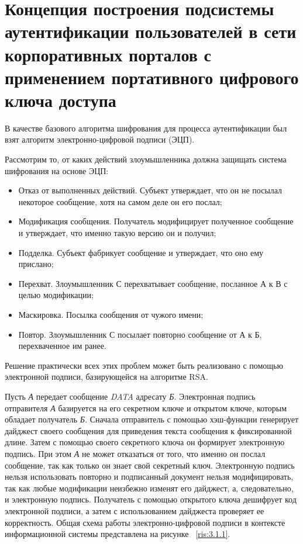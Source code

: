 \section{Концепция построения подсистемы аутентификации пользователей в сети
корпоративных порталов с применением портативного цифрового ключа доступа}
\label{sect:concept}
В качестве базового алгоритма шифрования для процесса аутентификации был взят
алгоритм электронно-цифровой подписи (ЭЦП).

Рассмотрим то, от каких действий злоумышленника должна защищать система
шифрования на основе ЭЦП:
\begin{itemize}
  \item Отказ от выполненных действий. Субъект утверждает, что он не посылал
  некоторое сообщение, хотя на самом деле он его послал;
\item Модификация сообщения. Получатель
модифицирует полученное сообщение и утверждает, что именно такую версию
он и получил;
\item Подделка. Субъект фабрикует сообщение и утверждает, что оно ему
прислано;
\item Перехват. Злоумышленник С перехватывает сообщение, посланное А к В с
целью модификации;
\item Маскировка. Посылка сообщения от чужого имени;
\item Повтор.
Злоумышленник С посылает повторно сообщение от А к Б, перехваченное им ранее.
\end{itemize}

Решение практически всех этих проблем может быть реализовано с помощью
электронной подписи, базирующейся на алгоритме RSA.~\cite{ECP}

Пусть \textit{А} передает сообщение \textit{DATA} адресату \textit{Б}.
Электронная подпись отправителя \textit{А} базируется на его секретном ключе и
открытом ключе, которым обладает получатель \textit{Б}. Сначала отправитель с
помощью хэш-функции генерирует дайджест своего сообщения для приведения текста сообщения к фиксированной длине. Затем с помощью
своего секретного ключа он формирует электронную подпись. При этом \textit{А} не
может отказаться от того, что именно он послал сообщение, так как только он знает свой
секретный ключ. Электронную подпись нельзя использовать повторно и подписанный
документ нельзя модифицировать, так как любые модификации неизбежно изменят его
дайджест, а, следовательно, и электронную подпись. Получатель с помощью
открытого ключа дешифрует код электронной подписи, а затем с использованием
дайджеста проверяет ее корректность. Общая схема работы электронно-цифровой
подписи в контексте информационной системы представлена на рисунке
~\ref{ris:3.1.1}.

